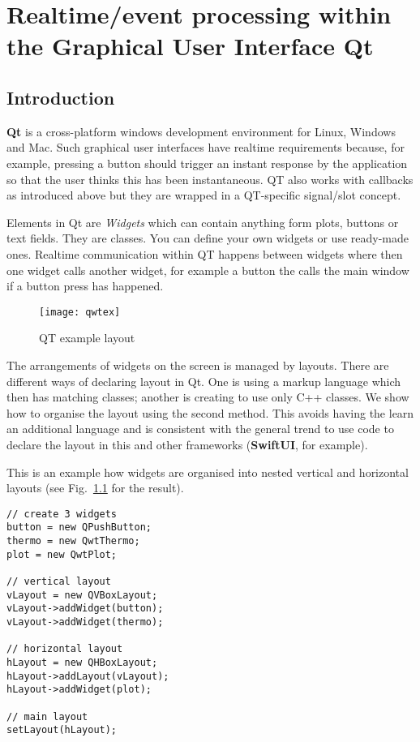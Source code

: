 \documentclass[12pt]{report}
\begin{document}
\chapter{Realtime/event processing within the Graphical User Interface Qt\label{qt}}

\section{Introduction}
\textbf{Qt} is a cross-platform windows development environment for
Linux, Windows and Mac. Such graphical user interfaces have realtime
requirements because, for example, pressing a button should trigger an
instant response by the application so that the user thinks this has
been instantaneous. QT also works with callbacks as introduced above
but they are wrapped in a QT-specific signal/slot concept.

Elements in Qt are \textsl{Widgets} which can contain anything form
plots, buttons or text fields. They are classes. You can define your
own widgets or use ready-made ones. Realtime communication within QT
happens between widgets where then one widget calls another widget,
for example a button the calls the main window if a button press has
happened.

\begin{figure}[!hbt]
\begin{center}
\mbox{\texttt{[image: qwtex]}}
\end{center}
\caption{QT example layout
\label{qwtex}}
\end{figure}

The arrangements of widgets on the screen is managed by
layouts. There are different ways of declaring layout in Qt. One is
using a markup language which then has matching classes;
another is creating to use only C++ classes.
We show how to organise the layout using the second method.
This avoids having the learn an additional language and is
consistent with the general  trend to use code to declare the layout
in this and other frameworks (\textbf{SwiftUI}, for example).

This is an example how widgets are organised into
nested vertical and horizontal layouts (see Fig.~\ref{qwtex}
for the result).
\begin{verbatim}
// create 3 widgets
button = new QPushButton;
thermo = new QwtThermo; 
plot = new QwtPlot;

// vertical layout
vLayout = new QVBoxLayout;
vLayout->addWidget(button);
vLayout->addWidget(thermo);

// horizontal layout
hLayout = new QHBoxLayout;
hLayout->addLayout(vLayout);
hLayout->addWidget(plot);

// main layout
setLayout(hLayout);
\end{verbatim}
\end{document}
